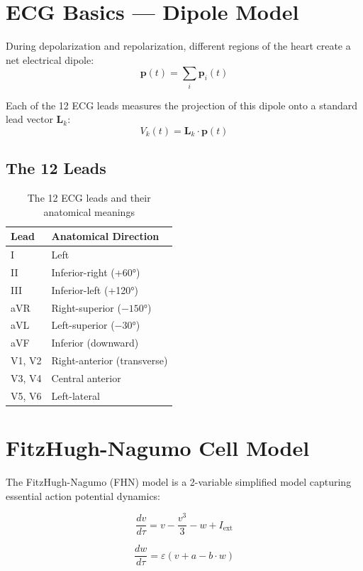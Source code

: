 \documentclass[12pt,oneside,a4paper]{book}
\begin{document}
\section{ECG Basics --- Dipole Model}

During depolarization and repolarization, different regions of the heart create a net electrical dipole:
$$\mathbf{p}(t) = \sum_i \mathbf{p}_i(t)$$

Each of the 12 ECG leads measures the projection of this dipole onto a standard lead vector $\mathbf{L}_k$:
$$V_k(t) = \mathbf{L}_k \cdot \mathbf{p}(t)$$

\subsection{The 12 Leads}

\begin{table}[htb]
\centering
\begin{tabularx}{\textwidth}{|l|X|}
\hline
\textbf{Lead} & \textbf{Anatomical Direction} \\
\hline
I & Left \\
II & Inferior-right (+60°) \\
III & Inferior-left (+120°) \\
aVR & Right-superior ($-150°$) \\
aVL & Left-superior ($-30°$) \\
aVF & Inferior (downward) \\
V1, V2 & Right-anterior (transverse) \\
V3, V4 & Central anterior \\
V5, V6 & Left-lateral \\
\hline
\end{tabularx}
\caption{The 12 ECG leads and their anatomical meanings}
\label{tab:leads}
\end{table}

\section{FitzHugh-Nagumo Cell Model}

The FitzHugh-Nagumo (FHN) model is a 2-variable simplified model capturing essential action potential dynamics:

\begin{equation}
\frac{dv}{d\tau} = v - \frac{v^3}{3} - w + I_{\text{ext}}
\end{equation}

\begin{equation}
\frac{dw}{d\tau} = \varepsilon (v + a - b \cdot w)
\end{equation}
\end{document}
